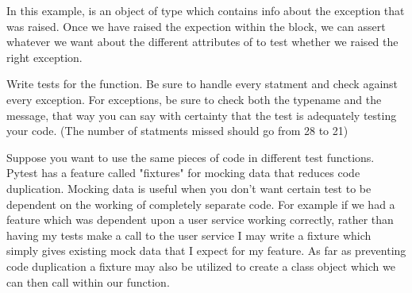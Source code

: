 In this example,  is an object of type  which contains info about the exception that was raised.  Once we have raised the expection within the  block, we can assert whatever we want about the different attributes of  to test whether we raised the right exception.

\begin{problem}
Write tests for the  function.  Be sure to handle every statment and check against every exception.
For exceptions, be sure to check both the typename and the message, that way you can say with certainty that the test is adequately testing your code.
(The number of statments missed should go from 28 to 21)
\end{problem}

Suppose you want to use the same pieces of code in different test functions. Pytest has a feature called "fixtures" for mocking data that reduces code duplication. 
Mocking data is useful when you don't want certain test to be dependent on the working of completely separate code.
For example if we had a feature which was dependent upon a user service working correctly, rather than having my tests make a call to the user service I may write a fixture which simply gives existing mock data that I expect for my feature.
As far as preventing code duplication a fixture may also be utilized to create a class object which we can then call within our function.

